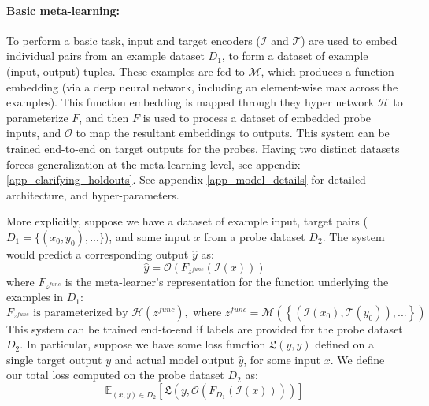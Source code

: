 \documentclass{article}
\begin{document}
\paragraph{Basic meta-learning:} To perform a basic task, input and target encoders ($\mathcal{I}$ and $\mathcal{T}$) are used to embed individual pairs from an example dataset \(D_1\), to form a dataset of example (input, output) tuples. These examples are fed to $\mathcal{M}$, which produces a function embedding (via a deep neural network, including an element-wise max across the examples). This function embedding is mapped through they hyper network $\mathcal{H}$ to parameterize $F$, and then $F$ is used to process a dataset of embedded probe inputs, and $\mathcal{O}$ to map the resultant embeddings to outputs. This system can be trained end-to-end on target outputs for the probes. Having two distinct datasets forces generalization at the meta-learning level, see appendix \ref{app_clarifying_holdouts}. See appendix \ref{app_model_details} for detailed architecture, and hyper-parameters. \par 
More explicitly, suppose we have a dataset of example input, target pairs ($D_1 = \{(x_0, y_0), ...\}$), and some input $x$ from a probe dataset $D_2$. The system would predict a corresponding output $\hat{y}$ as: 
\[\hat{y} = \mathcal{O}\left(F_{z^{func}}\left(\mathcal{I} \left(x\right)\right) \right)\]
where $F_{z^{func}}$ is the meta-learner's representation for the function underlying the examples in $D_1$:
\[F_{z^{func}} \text{ is parameterized by } \mathcal{H}\left(z^{func}\right), \text{ where } z^{func} = \mathcal{M}\left( \left\{\left(\mathcal{I}\left(x_0\right), \mathcal{T}\left(y_0\right) \right), ... \right\}\right)\]
This system can be trained end-to-end if labels are provided for the probe dataset $D_2$. In particular, suppose we have some loss function $\mathfrak{L}(y, \hat{y})$ defined on a single target output $y$ and actual model output $\hat{y}$, for some input $x$. We define our total loss computed on the probe dataset $D_2$ as:
\[\mathbb{E}_{(x, y)\in {D}_2} \left[ \mathfrak{L}\left(y, \mathcal{O}\left(F_{D_1}\left(\mathcal{I} \left(x\right)\right) \right)\right)\right]\]
\end{document}
